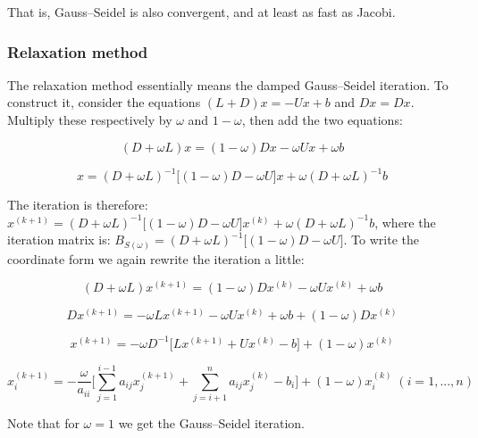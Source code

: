 \documentclass[margin=0px]{article}
\begin{document}
\noindent That is, Gauss--Seidel is also convergent, and at least as fast as Jacobi.

\subsubsection{Relaxation method}

The relaxation method essentially means the damped Gauss--Seidel iteration. To construct it,
consider the equations $(L+D)x = -Ux + b$ and $Dx = Dx$. Multiply these respectively by $\omega$ and
$1 - \omega$, then add the two equations:

\begin{displaymath}
    (D+\omega L)x = (1 - \omega)Dx -\omega Ux + \omega b
\end{displaymath}

\begin{displaymath}
    x = (D+\omega L)^{-1}\big[(1 - \omega)D -\omega U \big]x + \omega (D+\omega L)^{-1}b
\end{displaymath}

The iteration is therefore: $x^{(k+1)} = (D+\omega L)^{-1}\big[(1 - \omega)D -\omega U \big]x^{(k)} + \omega (D+\omega L)^{-1}b$, where
the iteration matrix is: $B_{S(\omega)}= (D+\omega L)^{-1}\big[(1 - \omega)D -\omega U \big]$. To write the coordinate form
we again rewrite the iteration a little:

\begin{displaymath}
    (D + \omega L)x^{(k+1)} = (1 - \omega)Dx^{(k)} -\omega Ux^{(k)} + \omega b
\end{displaymath}

\begin{displaymath}
    Dx^{(k+1)} =  -\omega Lx^{(k+1)} -\omega Ux^{(k)} + \omega b + (1 - \omega)Dx^{(k)}
\end{displaymath}

\begin{displaymath}
    x^{(k+1)} = -\omega D^{-1} \big[Lx^{(k+1)} + Ux^{(k)} - b \big] + (1 - \omega)x^{(k)}
\end{displaymath}

\begin{displaymath}
    x^{(k+1)}_{i} =
    -\frac{\omega}{a_{ii}}
    \Bigg[
    \sum_{j=1}^{i-1} a_{ij}x_{j}^{(k+1)} +
    \sum_{j=i+1}^{n} a_{ij}x_{j}^{(k)}	-
    b_{i}
    \Bigg] +
    (1 - \omega) x_{i}^{(k)}
    \; (i = 1, ..., n)
\end{displaymath}

\noindent Note that for $\omega = 1$ we get the Gauss--Seidel iteration.\\
\end{document}
